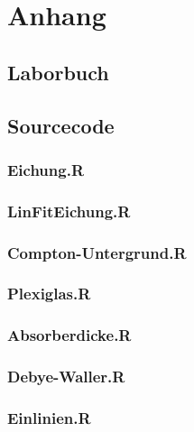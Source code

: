 \section{Anhang}

\subsection{Laborbuch}

\subsection{Sourcecode}

\subsubsection*{Eichung.R}\label{Energieeichung}


\subsubsection*{LinFitEichung.R}\label{LinFitEichung}


\subsubsection*{Compton-Untergrund.R}\label{Compton-Untergrund}


\subsubsection*{Plexiglas.R}\label{Plexi}


\subsubsection*{Absorberdicke.R}\label{Absorberdicke}


\subsubsection*{Debye-Waller.R}\label{debye}


\subsubsection*{Einlinien.R}\label{einlinien1}


